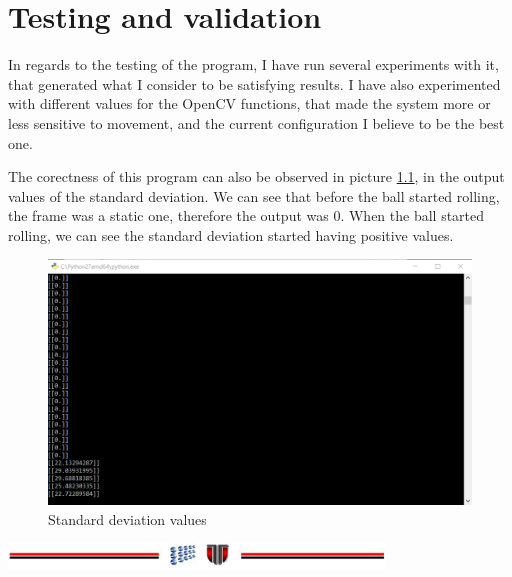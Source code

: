 \documentclass[a4paper,12pt]{report}
\begin{document}
\chapter{Testing and validation}

In regards to the testing of the program, I have run several experiments with it, that generated what I consider to be satisfying results. I have also experimented with different values for the OpenCV functions, that made the system more or less sensitive to movement, and the current configuration I believe to be the best one.

The corectness of this program can also be observed in picture \ref{fig:pic3}, in the output values of the standard deviation. We can see that before the ball started rolling, the frame was a static one, therefore the output was 0. When the ball started rolling, we can see the standard deviation started having positive values.

\vspace{0.5cm}
\begin{figure}[h!]
  \centering
    \includegraphics[width=\linewidth]{fig/img6.png}
  \caption{Standard deviation values}
  \label{fig:pic3}
\end{figure}

\vspace{0.5cm}





\vspace{2cm}
\begin{center}
\includegraphics[width=10cm]{fig/footer}
\end{center}
\end{document}

